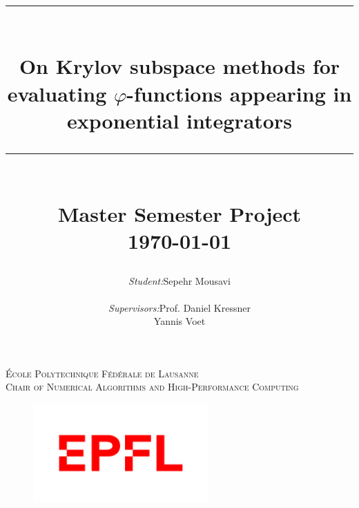 \documentclass[12pt, a4paper]{article}
\title{
	\rule{\linewidth}{0.5mm}\\
	\Large \textbf{{
		On Krylov subspace methods for evaluating $\varphi$-functions
		appearing in exponential integrators
	}}
	\rule{\linewidth}{0.5mm}\\
	\normalsize {\textbf{Master Semester Project}}\\
	\normalsize \today\\[1.5cm]
}
\author{
	\begin{tabular}{lll}
		\textit{Student:} & Sepehr Mousavi\\
		& \\
		\textit{Supervisors:} & Prof. Daniel Kressner\\
		\textit{} & Yannis Voet\\
	\end{tabular}
}
\begin{document}
	\begin{titlepage}
		\center

		\makeatletter
		\def\printauthor{{\centering \large \@author}}
		\makeatother

		\makeatletter
		\def\printtitle{{\centering \@title\par}}
		\makeatother

		\textsc{
			\large École Polytechnique Fédérale de Lausanne\\
			\large Chair of Numerical Algorithms and High-Performance Computing
		}\\[1cm]
		\vspace{3cm}
		\printtitle
		\vspace{2cm}
		\printauthor
		\vfill
		\begin{figure}[h]
			\centering
			\includegraphics[width = 0.6\textwidth]{img/EPFLlogo.png}
		\end{figure}

	\end{titlepage}

	\tableofcontents
	\thispagestyle{plain}
	\newpage


	
	\newpage
	
\end{document}
